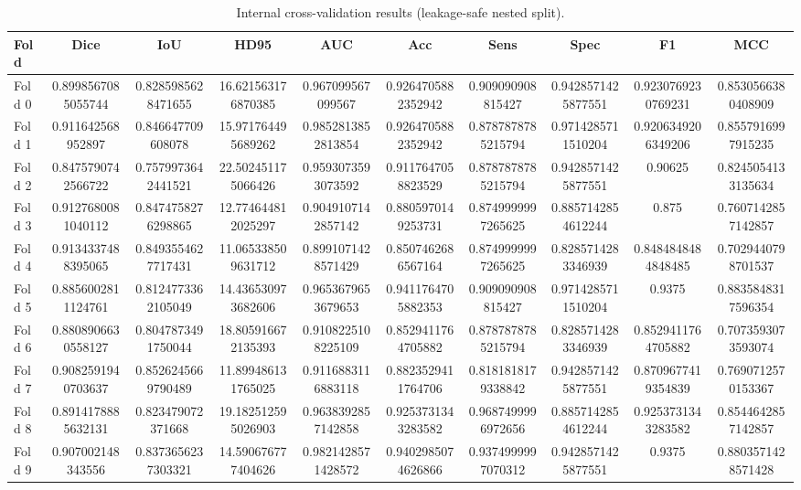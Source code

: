 \begin{table}[htbp]
  \centering
  \caption{Internal cross-validation results (leakage-safe nested split).}
  \label{tab:internal_cv}
  \begin{tabular}{lccccccccc}
    \toprule
    Fold & Dice & IoU & HD95 & AUC & Acc & Sens & Spec & F1 & MCC \\
    \midrule
    Fold 0 & 0.8998567085055744 & 0.8285985628471655 & 16.621563176870385 & 0.967099567099567 & 0.9264705882352942 & 0.909090908815427 & 0.9428571425877551 & 0.9230769230769231 & 0.8530566380408909 \\
    Fold 1 & 0.911642568952897 & 0.846647709608078 & 15.971764495689262 & 0.9852813852813854 & 0.9264705882352942 & 0.8787878785215794 & 0.9714285711510204 & 0.9206349206349206 & 0.8557916997915235 \\
    Fold 2 & 0.8475790742566722 & 0.7579973642441521 & 22.502451175066426 & 0.9593073593073592 & 0.9117647058823529 & 0.8787878785215794 & 0.9428571425877551 & 0.90625 & 0.8245054133135634 \\
    Fold 3 & 0.9127680081040112 & 0.8474758276298865 & 12.774644812025297 & 0.9049107142857142 & 0.8805970149253731 & 0.8749999997265625 & 0.8857142854612244 & 0.875 & 0.7607142857142857 \\
    Fold 4 & 0.9134337488395065 & 0.8493554627717431 & 11.065338509631712 & 0.8991071428571429 & 0.8507462686567164 & 0.8749999997265625 & 0.8285714283346939 & 0.8484848484848485 & 0.7029440798701537 \\
    Fold 5 & 0.8856002811124761 & 0.8124773362105049 & 14.436530973682606 & 0.9653679653679653 & 0.9411764705882353 & 0.909090908815427 & 0.9714285711510204 & 0.9375 & 0.8835848317596354 \\
    Fold 6 & 0.8808906630558127 & 0.8047873491750044 & 18.805916672135393 & 0.9108225108225109 & 0.8529411764705882 & 0.8787878785215794 & 0.8285714283346939 & 0.8529411764705882 & 0.7073593073593074 \\
    Fold 7 & 0.9082591940703637 & 0.8526245669790489 & 11.899486131765025 & 0.9116883116883118 & 0.8823529411764706 & 0.8181818179338842 & 0.9428571425877551 & 0.8709677419354839 & 0.7690712570153367 \\
    Fold 8 & 0.8914178885632131 & 0.823479072371668 & 19.182512595026903 & 0.9638392857142858 & 0.9253731343283582 & 0.9687499996972656 & 0.8857142854612244 & 0.9253731343283582 & 0.8544642857142857 \\
    Fold 9 & 0.907002148343556 & 0.8373656237303321 & 14.590676777404626 & 0.9821428571428572 & 0.9402985074626866 & 0.9374999997070312 & 0.9428571425877551 & 0.9375 & 0.8803571428571428 \\

\end{tabular}
\end{table}
